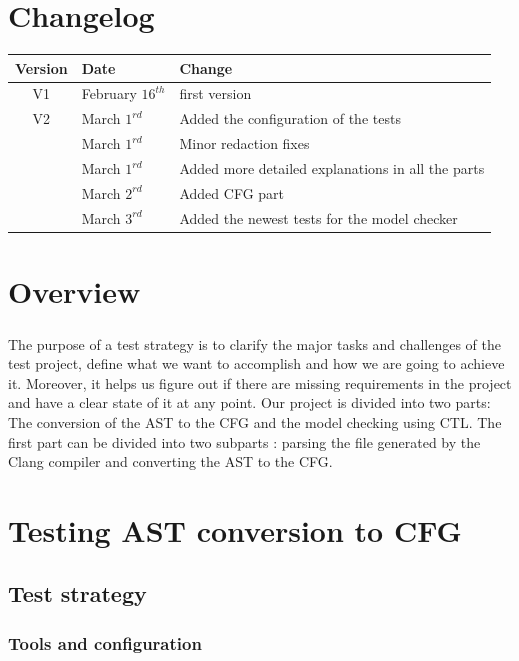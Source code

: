 \documentclass{report}
\begin{document}
\chapter* {Changelog}
\begin{center}
\begin{tabular}{|c|l|l|}
  \hline
  Version & Date & Change  \\
  \hline
  V1 & February $16^{th}$ & first version \\
  \hline
  V2 & March $1^{rd}$  & Added the configuration of the tests \\
  & March $1^{rd}$  & Minor redaction fixes \\
  & March $1^{rd}$  & Added more detailed explanations in all the parts \\
  & March $2^{rd}$  & Added CFG part \\
& March $3^{rd}$  & Added the newest tests for the model checker \\
  \hline
\end{tabular}
\end{center}
\chapter* {Overview}
\paragraph{}
\hspace{4mm}The purpose of a test strategy is to clarify the major tasks and challenges of the test project, define what we want to accomplish and how we are going to achieve it. 
Moreover, it helps us figure out if there are missing requirements in the project and have a clear state of it at any point.
Our project is divided into two parts: The conversion of the AST to the CFG and the model checking using CTL.
The first part can be divided into two subparts : parsing the file generated by the Clang compiler and converting the AST to the CFG.

\chapter{Testing AST conversion to CFG}

\section{Test strategy}

\subsection{Tools and configuration}
\end{document}
